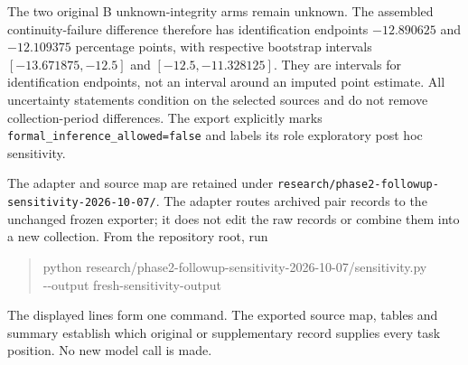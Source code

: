 \documentclass[11pt,a4paper]{article}
\newcommand{\code}[1]{\nolinkurl{#1}}
\begin{document}
The two original B unknown-integrity arms remain unknown. The assembled continuity-failure difference therefore has identification endpoints $-12.890625$ and $-12.109375$ percentage points, with respective bootstrap intervals $[-13.671875,-12.5]$ and $[-12.5,-11.328125]$. They are intervals for identification endpoints, not an interval around an imputed point estimate. All uncertainty statements condition on the selected sources and do not remove collection-period differences. The export explicitly marks \code{formal_inference_allowed=false} and labels its role exploratory post hoc sensitivity.

The adapter and source map are retained under \code{research/phase2-followup-sensitivity-2026-10-07/}. The adapter routes archived pair records to the unchanged frozen exporter; it does not edit the raw records or combine them into a new collection. From the repository root, run
\begin{quote}\small\ttfamily
python research/phase2-followup-sensitivity-2026-10-07/sensitivity.py\\
\hspace*{1em}-{}-output fresh-sensitivity-output
\end{quote}
The displayed lines form one command. The exported source map, tables and summary establish which original or supplementary record supplies every task position. No new model call is made.
\end{document}
